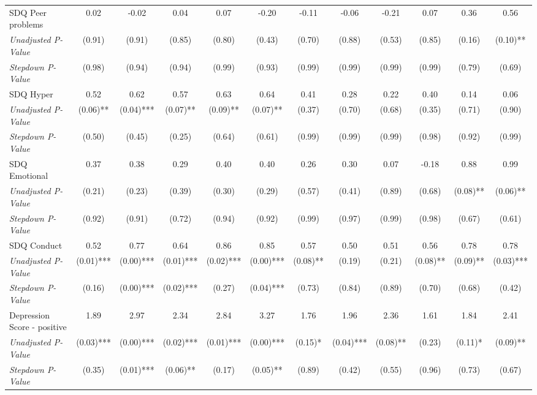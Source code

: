 \begin{tabular}{l c c c c c c c c c c c}
SDQ Peer problems & 0.02 & -0.02 & 0.04 & 0.07 & -0.20 & -0.11 & -0.06 & -0.21 & 0.07 & 0.36 & 0.56 \\
\quad \textit{Unadjusted P-Value} & (0.91) & (0.91) & (0.85) & (0.80) & (0.43) & (0.70) & (0.88) & (0.53) & (0.85) & (0.16) & (0.10)** \\
\quad \textit{Stepdown P-Value} & (0.98) & (0.94) & (0.94) & (0.99) & (0.93) & (0.99) & (0.99) & (0.99) & (0.99) & (0.79) & (0.69) \\
SDQ Hyper & 0.52 & 0.62 & 0.57 & 0.63 & 0.64 & 0.41 & 0.28 & 0.22 & 0.40 & 0.14 & 0.06 \\
\quad \textit{Unadjusted P-Value} & (0.06)** & (0.04)*** & (0.07)** & (0.09)** & (0.07)** & (0.37) & (0.70) & (0.68) & (0.35) & (0.71) & (0.90) \\
\quad \textit{Stepdown P-Value} & (0.50) & (0.45) & (0.25) & (0.64) & (0.61) & (0.99) & (0.99) & (0.99) & (0.98) & (0.92) & (0.99) \\
SDQ Emotional & 0.37 & 0.38 & 0.29 & 0.40 & 0.40 & 0.26 & 0.30 & 0.07 & -0.18 & 0.88 & 0.99 \\
\quad \textit{Unadjusted P-Value} & (0.21) & (0.23) & (0.39) & (0.30) & (0.29) & (0.57) & (0.41) & (0.89) & (0.68) & (0.08)** & (0.06)** \\
\quad \textit{Stepdown P-Value} & (0.92) & (0.91) & (0.72) & (0.94) & (0.92) & (0.99) & (0.97) & (0.99) & (0.98) & (0.67) & (0.61) \\
SDQ Conduct & 0.52 & 0.77 & 0.64 & 0.86 & 0.85 & 0.57 & 0.50 & 0.51 & 0.56 & 0.78 & 0.78 \\
\quad \textit{Unadjusted P-Value} & (0.01)*** & (0.00)*** & (0.01)*** & (0.02)*** & (0.00)*** & (0.08)** & (0.19) & (0.21) & (0.08)** & (0.09)** & (0.03)*** \\
\quad \textit{Stepdown P-Value} & (0.16) & (0.00)*** & (0.02)*** & (0.27) & (0.04)*** & (0.73) & (0.84) & (0.89) & (0.70) & (0.68) & (0.42) \\
Depression Score - positive & 1.89 & 2.97 & 2.34 & 2.84 & 3.27 & 1.76 & 1.96 & 2.36 & 1.61 & 1.84 & 2.41 \\
\quad \textit{Unadjusted P-Value} & (0.03)*** & (0.00)*** & (0.02)*** & (0.01)*** & (0.00)*** & (0.15)* & (0.04)*** & (0.08)** & (0.23) & (0.11)* & (0.09)** \\
\quad \textit{Stepdown P-Value} & (0.35) & (0.01)*** & (0.06)** & (0.17) & (0.05)** & (0.89) & (0.42) & (0.55) & (0.96) & (0.73) & (0.67) \\
\bottomrule
\end{tabular}
